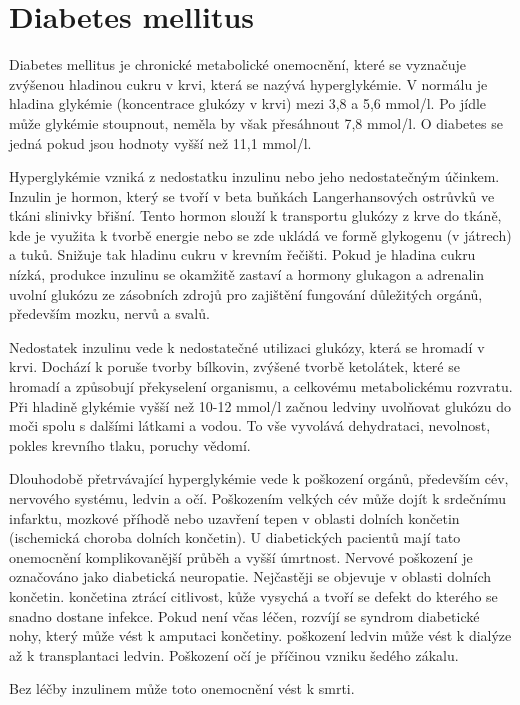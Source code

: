 \chapter{Diabetes mellitus}

Diabetes mellitus je chronické metabolické onemocnění, které se vyznačuje zvýšenou hladinou cukru v krvi, která se nazývá hyperglykémie. V normálu je hladina glykémie (koncentrace glukózy v krvi) mezi 3,8 a 5,6 mmol/l. Po jídle může glykémie stoupnout, neměla by však přesáhnout 7,8 mmol/l. O diabetes se jedná pokud jsou hodnoty vyšší než 11,1 mmol/l.

Hyperglykémie vzniká z nedostatku inzulinu nebo jeho nedostatečným účinkem. Inzulin je hormon, který se tvoří v beta buňkách Langerhansových ostrůvků ve tkáni slinivky břišní. Tento hormon slouží k transportu glukózy z krve do tkáně, kde je využita k tvorbě energie nebo se zde ukládá ve formě glykogenu (v játrech) a tuků. Snižuje tak hladinu cukru v krevním řečišti. Pokud je hladina cukru nízká, produkce inzulinu se okamžitě zastaví  a hormony glukagon a adrenalin uvolní glukózu ze zásobních zdrojů pro zajištění fungování důležitých orgánů, především mozku, nervů a svalů.

Nedostatek inzulinu vede k nedostatečné utilizaci glukózy, která se hromadí v krvi. Dochází k poruše tvorby bílkovin, zvýšené tvorbě ketolátek, které se hromadí a způsobují překyselení organismu, a celkovému metabolickému rozvratu. Při hladině glykémie vyšší než 10-12 mmol/l začnou ledviny uvolňovat glukózu do moči spolu s dalšími látkami a vodou. To vše vyvolává dehydrataci, nevolnost, pokles krevního tlaku, poruchy vědomí.

Dlouhodobě přetrvávající hyperglykémie vede k poškození orgánů, především cév, nervového systému, ledvin a očí. Poškozením velkých cév může dojít k srdečnímu infarktu, mozkové příhodě nebo uzavření tepen v oblasti dolních končetin (ischemická choroba dolních končetin). U diabetických pacientů mají tato onemocnění komplikovanější průběh a vyšší úmrtnost. Nervové poškození je označováno jako diabetická neuropatie. Nejčastěji se objevuje v oblasti dolních končetin. končetina ztrácí citlivost, kůže vysychá a tvoří se defekt do kterého se snadno dostane infekce. Pokud není včas léčen, rozvíjí se syndrom diabetické nohy, který může vést k amputaci končetiny. poškození ledvin může vést k dialýze až k transplantaci ledvin. Poškození očí je příčinou vzniku šedého zákalu.

Bez léčby inzulinem může toto onemocnění vést k smrti. \cite{Diabetes.Psottova,Wikiskripta,cukrovka.cz,Diabetes.TaiN}


